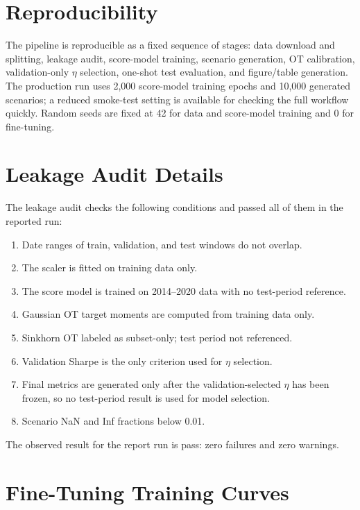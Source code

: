 \documentclass{article}
\begin{document}
\appendix

\section{Reproducibility}
\label{app:repro}

The pipeline is reproducible as a fixed sequence of stages: data download and
splitting, leakage audit, score-model training, scenario generation, OT
calibration, validation-only \(\eta\) selection, one-shot test evaluation, and
figure/table generation. The production run uses 2,000 score-model training
epochs and 10,000 generated scenarios; a reduced smoke-test setting is available
for checking the full workflow quickly. Random seeds are fixed at 42 for data and
score-model training and 0 for fine-tuning.

\section{Leakage Audit Details}
\label{app:audit}

The leakage audit checks the following conditions and passed all of them in the
reported run:
\begin{enumerate}
  \item Date ranges of train, validation, and test windows do not overlap.
  \item The scaler is fitted on training data only.
  \item The score model is trained on 2014--2020 data with no test-period reference.
  \item Gaussian OT target moments are computed from training data only.
  \item Sinkhorn OT labeled as subset-only; test period not referenced.
  \item Validation Sharpe is the only criterion used for \(\eta\) selection.
  \item Final metrics are generated only after the validation-selected \(\eta\)
        has been frozen, so no test-period result is used for model selection.
  \item Scenario NaN and Inf fractions below 0.01.
\end{enumerate}

The observed result for the report run is pass: zero failures and zero warnings.

\section{Fine-Tuning Training Curves}
\label{app:ft}
\end{document}
